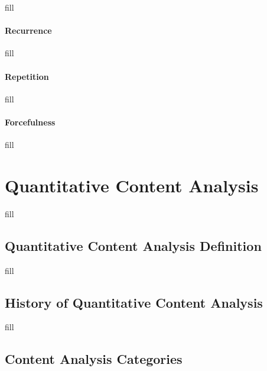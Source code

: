 \documentclass[
  b5paper]{book}
\begin{document}
fill

\hypertarget{recurrence}{%
\subsubsection*{Recurrence}\label{recurrence}}

fill

\hypertarget{repetition}{%
\subsubsection*{Repetition}\label{repetition}}

fill

\hypertarget{forcefulness}{%
\subsubsection*{Forcefulness}\label{forcefulness}}

fill

\hypertarget{quantitative-content-analysis-1}{%
\chapter{Quantitative Content Analysis}\label{quantitative-content-analysis-1}}

fill

\hypertarget{quantitative-content-analysis-definition}{%
\section{Quantitative Content Analysis Definition}\label{quantitative-content-analysis-definition}}

fill

\hypertarget{history-of-quantitative-content-analysis}{%
\section{History of Quantitative Content Analysis}\label{history-of-quantitative-content-analysis}}

fill

\hypertarget{content-analysis-categories}{%
\section{Content Analysis Categories}\label{content-analysis-categories}}
\end{document}
